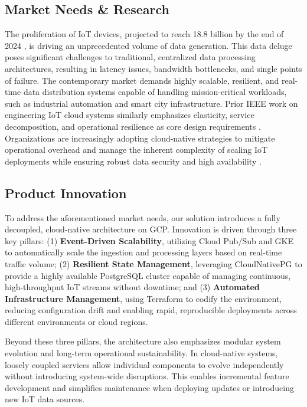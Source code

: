 \documentclass[conference]{IEEEtran}
\begin{document}
\subsection{Market Needs \& Research}

The proliferation of IoT devices, projected to reach 18.8 billion by the end of 2024 \cite{iot_market_2024}, is driving an unprecedented volume of data generation. This data deluge poses significant challenges to traditional, centralized data processing architectures, resulting in latency issues, bandwidth bottlenecks, and single points of failure. The contemporary market demands highly scalable, resilient, and real-time data distribution systems capable of handling mission-critical workloads, such as industrial automation and smart city infrastructure. Prior IEEE work on engineering IoT cloud systems similarly emphasizes elasticity, service decomposition, and operational resilience as core design requirements \cite{truong2015iotcloud}. Organizations are increasingly adopting cloud-native strategies to mitigate operational overhead and manage the inherent complexity of scaling IoT deployments while ensuring robust data security and high availability \cite{cloud_native_iot_trends}.



\subsection{Product Innovation}

To address the aforementioned market needs, our solution introduces a fully decoupled, cloud-native architecture on GCP. Innovation is driven through three key pillars: (1) 	\textbf{Event-Driven Scalability}, utilizing Cloud Pub/Sub and GKE to automatically scale the ingestion and processing layers based on real-time traffic volume; (2) 	\textbf{Resilient State Management}, leveraging CloudNativePG to provide a highly available PostgreSQL cluster capable of managing continuous, high-throughput IoT streams without downtime; and (3) 	\textbf{Automated Infrastructure Management}, using Terraform to codify the environment, reducing configuration drift and enabling rapid, reproducible deployments across different environments or cloud regions.

Beyond these three pillars, the architecture also emphasizes modular system evolution and long-term operational sustainability. In cloud-native systems, loosely coupled services allow individual components to evolve independently without introducing system-wide disruptions. This enables incremental feature development and simplifies maintenance when deploying updates or introducing new IoT data sources.
\end{document}
